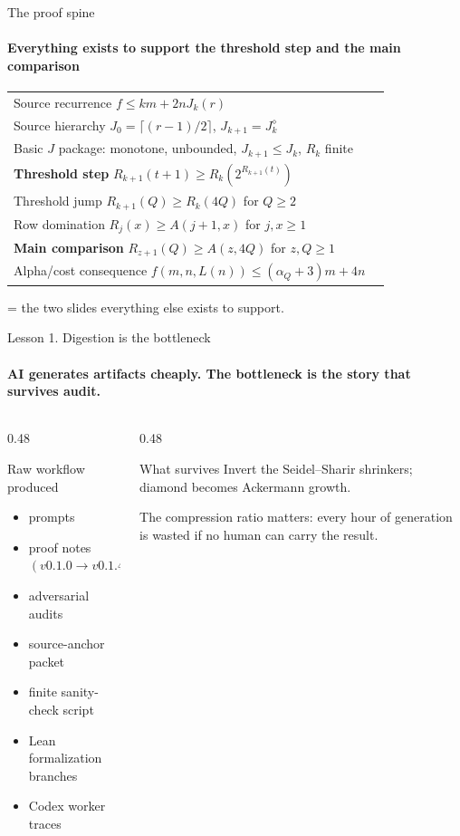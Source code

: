\documentclass[aspectratio=169,11pt]{beamer}
\newcommand{\yes}{\textcolor{stanfordred}{\ding{72}}}
\begin{document}
\begin{frame}{The proof spine}
\framesubtitle{Everything exists to support the threshold step and the main comparison}
\small
\begin{center}
\begin{tabular}{>{\raggedright\arraybackslash}p{}c}
\toprule
Source recurrence $f\le k m+2nJ_k(r)$ & \\
Source hierarchy $J_0=\lceil(r-1)/2\rceil$, $J_{k+1}=J_k^\diamond$ & \\
Basic $J$ package: monotone, unbounded, $J_{k+1}\le J_k$, $R_k$ finite & \\
\textbf{Threshold step} $R_{k+1}(t+1)\ge R_k(2^{R_{k+1}(t)})$ & \yes \\
Threshold jump $R_{k+1}(Q)\ge R_k(4Q)$ for $Q\ge 2$ & \\
Row domination $R_j(x)\ge A(j+1,x)$ for $j,x\ge 1$ & \\
\textbf{Main comparison} $R_{z+1}(Q)\ge A(z,4Q)$ for $z,Q\ge 1$ & \yes \\
Alpha/cost consequence $f(m,n,L(n))\le (\alpha_Q+3)m+4n$ & \\
\bottomrule
\end{tabular}
\end{center}
\vspace{0.15cm}
\begin{center}
\yes\; = the two slides everything else exists to support.
\end{center}
\end{frame}

\begin{frame}{Lesson 1. Digestion is the bottleneck}
\framesubtitle{AI generates artifacts cheaply. The bottleneck is the story that survives audit.}
\begin{columns}[T,totalwidth=\textwidth]
\begin{column}{0.48\textwidth}
\begin{block}{Raw workflow produced}
\begin{itemize}
  \item prompts
  \item proof notes $(v0.1.0\to v0.1.4)$
  \item adversarial audits
  \item source-anchor packet
  \item finite sanity-check script
  \item Lean formalization branches
  \item Codex worker traces
\end{itemize}
\end{block}
\end{column}
\begin{column}{0.48\textwidth}
\begin{block}{What survives}
\centering
\Large
Invert the Seidel--Sharir shrinkers; diamond becomes Ackermann growth.
\end{block}
\vspace{0.3cm}
The compression ratio matters: every hour of generation is wasted if no human can carry the result.
\end{column}
\end{columns}
\end{frame}
\end{document}
